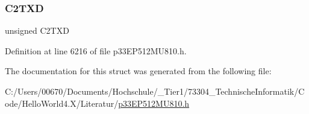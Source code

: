 \mbox{\label{structtag_c2_t_x_d_b_i_t_s_ab7f1c507107af2857b2746b23d90eb42}} 
\subsubsection{\texorpdfstring{C2\+T\+XD}{C2TXD}}
{\footnotesize\ttfamily unsigned C2\+T\+XD}



Definition at line 6216 of file p33\+E\+P512\+M\+U810.\+h.



The documentation for this struct was generated from the following file\+:\begin{DoxyCompactItemize}
\item 
C\+:/\+Users/00670/\+Documents/\+Hochschule/\+\_\+\+Tier1/73304\+\_\+\+Technische\+Informatik/\+Code/\+Hello\+World4.\+X/\+Literatur/\hyperlink{p33_e_p512_m_u810_8h}{p33\+E\+P512\+M\+U810.\+h}\end{DoxyCompactItemize}
